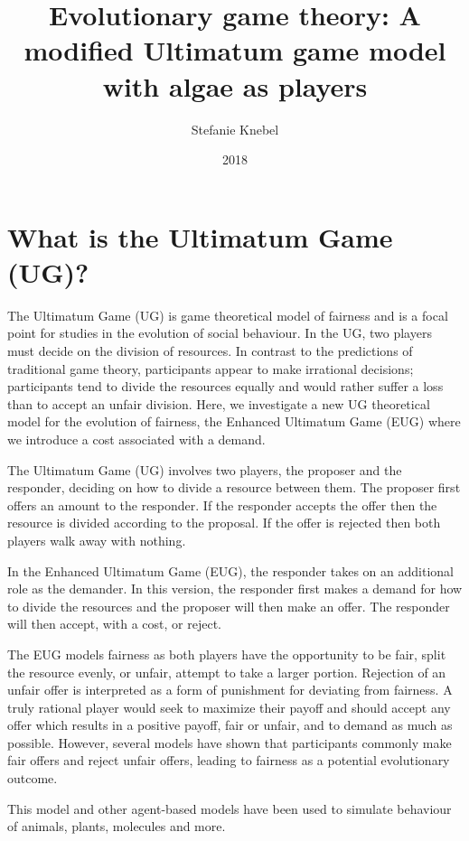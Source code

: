 \documentclass[]{article}
\title{Evolutionary game theory: A modified Ultimatum game model with algae as
players}
\author{Stefanie Knebel}
\date{2018}
\begin{document}
\maketitle

\section{What is the Ultimatum Game
(UG)?}\label{what-is-the-ultimatum-game-ug}

The Ultimatum Game (UG) is game theoretical model of fairness and is a
focal point for studies in the evolution of social behaviour. In the UG,
two players must decide on the division of resources. In contrast to the
predictions of traditional game theory, participants appear to make
irrational decisions; participants tend to divide the resources equally
and would rather suffer a loss than to accept an unfair division. Here,
we investigate a new UG theoretical model for the evolution of fairness,
the Enhanced Ultimatum Game (EUG) where we introduce a cost associated
with a demand.

The Ultimatum Game (UG) involves two players, the proposer and the
responder, deciding on how to divide a resource between them. The
proposer first offers an amount to the responder. If the responder
accepts the offer then the resource is divided according to the
proposal. If the offer is rejected then both players walk away with
nothing.

In the Enhanced Ultimatum Game (EUG), the responder takes on an
additional role as the demander. In this version, the responder first
makes a demand for how to divide the resources and the proposer will
then make an offer. The responder will then accept, with a cost, or
reject.

The EUG models fairness as both players have the opportunity to be fair,
split the resource evenly, or unfair, attempt to take a larger portion.
Rejection of an unfair offer is interpreted as a form of punishment for
deviating from fairness. A truly rational player would seek to maximize
their payoff and should accept any offer which results in a positive
payoff, fair or unfair, and to demand as much as possible. However,
several models have shown that participants commonly make fair offers
and reject unfair offers, leading to fairness as a potential
evolutionary outcome.

This model and other agent-based models have been used to simulate
behaviour of animals, plants, molecules and more.
\end{document}
